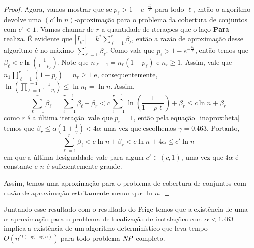 \begin{proof}
Agora, vamos mostrar que se $p_\ell > 1 - e^{ - \frac{\beta_\ell}{c}}$ para todo $\ell$, então o algoritmo devolve uma $(c'\ln n)$-aproximação para o problema da cobertura de conjuntos com $c' < 1$. Vamos chamar de $r$ a quantidade de iterações que o laço {\bf Para} realiza. É evidente que $|I_{k^*}| = k^*\sum_{\ell = 1}^r \beta_\ell$, então a razão de aproximação desse algoritmo é no máximo $\sum_{\ell = 1}^r \beta_\ell$. Como vale que $p_\ell > 1 - e^{ - \frac{\beta_\ell}{c}}$, então temos que $\beta_\ell < c \ln\left( \frac{1}{1-p_\ell}\right)$. Note que $n_{\ell + 1} = n_\ell(1-p_\ell)$ e $n_r \geq 1$. Assim, vale que $n_1 \prod_{\ell =1}^{r-1} (1 - p_\ell) = n_r \geq 1$ e, consequentemente, $\ln\left(\prod_{\ell =1 }^{r-1} \frac{1}{1-p_\ell}\right) \leq \ln n_1 = \ln n$. Assim,
\[
\sum_{\ell= 1}^r \beta_\ell = \sum_{\ell =1}^{r-1} \beta_\ell + \beta_r < c\sum_{\ell = 1}^{r-1} \ln \left( \frac{1}{1-p\ell}\right) + \beta_r \leq c \ln n + \beta_r
\]
como $r$ é a última iteração, vale que $p_r= 1$, então pela equação~\eqref{inaprox:beta} temos que $\beta_r \leq \alpha(1 + \frac{1}{\gamma}) < 4\alpha$ uma vez que escolhemos $\gamma = 0.463$. Portanto,
\[
\sum_{\ell =1}^r \beta_\ell < c \ln n + \beta_r < c\ln n + 4\alpha \leq c' \ln n
\]
em que a última desigualdade vale para algum $c' \in (c,1)$, uma vez que $4\alpha$ é constante e $n$ é suficientemente grande.

Assim, temos uma aproximação para o problema de cobertura de conjuntos com razão de aproximação estritamente menor que $\ln n$.
\end{proof}

Juntando esse resultado com o resultado do Feige temos que a existência de uma $\alpha$-aproximação para o problema de localização de instalações com $\alpha < 1.463$ implica a existência de um algoritmo determinístico que leva tempo $O(n^{O(\log \log n)})$ para todo problema $\mathit{NP}$-completo.